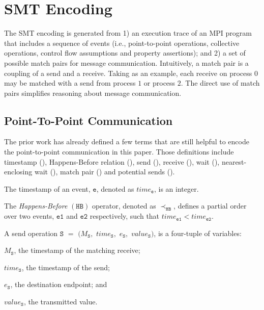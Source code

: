 \section{SMT Encoding}
The SMT encoding is generated from 1) an execution trace of an MPI program that includes a sequence of events (i.e., point-to-point operations, collective operations, control flow assumptions and property assertions); and 2) a set of possible match pairs for message communication. Intuitively, a match pair is a coupling of a send and a receive. Taking  as an example, each receive on process $0$ may be matched with a send from process $1$ or process $2$. The direct use of match pairs simplifies reasoning about message communication. 

\subsection{Point-To-Point Communication}
The prior work has already defined a few terms that are still helpful to encode the point-to-point communication in this paper. Those definitions include timestamp (), Happens-Before relation (), send (), receive (), wait (), nearest-enclosing wait (), match pair () and potential sends ().

\begin{definition}[Timestamp]\label{def:order}
\noindent The timestamp of an event, $\mathtt{e}$, denoted as $\mathit{time}_\mathtt{e}$, is an integer.
\end{definition}

\begin{definition}\label{def:happens-before}
The \emph{Happens-Before} $(\mathtt{HB})$ operator, denoted as
$\mathrm{\prec_\mathtt{HB}}$, defines a partial order over two events, $\mathtt{e1}$ and $\mathtt{e2}$ respectively, such that $\mathit{time}_\mathtt{e1} <  \mathit{time}_\mathtt{e2}$. 
\end{definition}

\begin{definition}[Send] \label{def:snd}
A send operation $\mathtt{S}$ $=$ $(M_\mathtt{S},$ $\mathit{time}_\mathtt{S},$ $e_\mathtt{S},$ $\mathit{value}_\mathtt{S})$, is a four-tuple of variables:
\begin{compactenum}
\item $M_\mathtt{S}$, the timestamp of the matching receive;
\item $\mathit{time}_\mathtt{S}$, the timestamp of the send;
\item $e_\mathtt{S}$, the destination endpoint; and
\item $\mathit{value}_\mathtt{S}$, the transmitted value.
\end{compactenum}
\end{definition}

